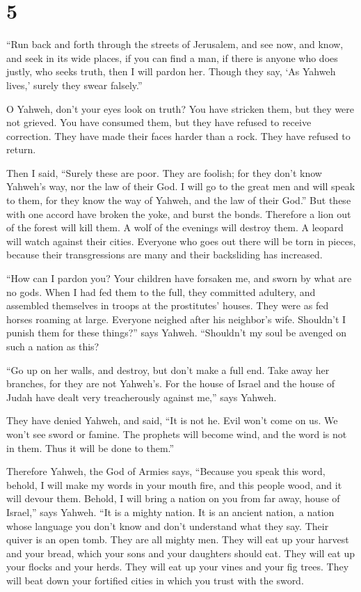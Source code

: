 \hypertarget{section-4}{%
\section{5}\label{section-4}}

 ``Run back and forth through the streets of Jerusalem,
and see now, and know, and seek in its wide places, if you can find a
man, if there is anyone who does justly, who seeks truth, then I will
pardon her.  Though they say, `As Yahweh lives,' surely
they swear falsely.''

 O Yahweh, don't your eyes look on truth? You have
stricken them, but they were not grieved. You have consumed them, but
they have refused to receive correction. They have made their faces
harder than a rock. They have refused to return.

 Then I said, ``Surely these are poor. They are foolish;
for they don't know Yahweh's way, nor the law of their God.
 I will go to the great men and will speak to them, for
they know the way of Yahweh, and the law of their God.'' But these with
one accord have broken the yoke, and burst the bonds. 
Therefore a lion out of the forest will kill them. A wolf of the
evenings will destroy them. A leopard will watch against their cities.
Everyone who goes out there will be torn in pieces, because their
transgressions are many and their backsliding has increased.

 ``How can I pardon you? Your children have forsaken me,
and sworn by what are no gods. When I had fed them to the full, they
committed adultery, and assembled themselves in troops at the
prostitutes' houses.  They were as fed horses roaming at
large. Everyone neighed after his neighbor's wife. 
Shouldn't I punish them for these things?'' says Yahweh. ``Shouldn't my
soul be avenged on such a nation as this?

 ``Go up on her walls, and destroy, but don't make a full
end. Take away her branches, for they are not Yahweh's. 
For the house of Israel and the house of Judah have dealt very
treacherously against me,'' says Yahweh.

 They have denied Yahweh, and said, ``It is not he. Evil
won't come on us. We won't see sword or famine.  The
prophets will become wind, and the word is not in them. Thus it will be
done to them.''

 Therefore Yahweh, the God of Armies says, ``Because you
speak this word, behold, I will make my words in your mouth fire, and
this people wood, and it will devour them.  Behold, I
will bring a nation on you from far away, house of Israel,'' says
Yahweh. ``It is a mighty nation. It is an ancient nation, a nation whose
language you don't know and don't understand what they say.
 Their quiver is an open tomb. They are all mighty men.
 They will eat up your harvest and your bread, which your
sons and your daughters should eat. They will eat up your flocks and
your herds. They will eat up your vines and your fig trees. They will
beat down your fortified cities in which you trust with the sword.

